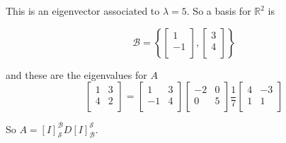\documentclass[a4paper,10pt]{article}
\theoremstyle{definition}
\begin{document}
This is an eigenvector associated to $\lambda = 5$. So a basis for
$\mathbb{R}^2$ is 

$$\mathcal{B} = \left\{
	\begin{bmatrix}
		1 \\
		-1 \\
	\end{bmatrix}
,
	\begin{bmatrix}
		3 \\
		4 \\
	\end{bmatrix}
\right\}
$$

and these are the eigenvalues for $A$
$$
\begin{bmatrix}
	1 & 3 \\
	4 & 2 \\
\end{bmatrix}
=
\begin{bmatrix}
	1 & 3 \\
	-1 & 4 \\
\end{bmatrix}
\begin{bmatrix}
	-2 & 0 \\
	0 & 5 \\
\end{bmatrix}
\frac{1}{7}
\begin{bmatrix}
	4 & -3 \\
	1 & 1 \\
\end{bmatrix}
$$

So $A = [I]_\mathcal{S}^\mathcal{B} D [I]_\mathcal{B}^\mathcal{S}$.
\begin{center}
\end{center}



\subsection{}
\end{document}
